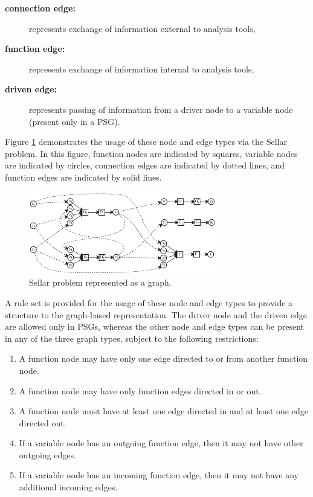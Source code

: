   \begin{description}
  \item[\bf{connection edge:}] represents exchange of information external to analysis tools,
  \item[\bf{function edge:}] represents exchange of information internal to analysis tools,
  \item[\bf{driven edge:}] represents passing of information from a driver node to a 
  variable node (present only in a PSG).
  \end{description}
  Figure \ref{f:sellar types} demonstrates the usage of these node and edge 
  types via the Sellar problem. 
In this figure, function nodes are indicated by squares, 
  variable nodes are indicated by circles, connection edges are indicated by 
  dotted lines, and function edges are indicated by solid lines.
  \begin{figure}[htb!]
    \begin{center}
      \includegraphics[width=3.25in]{images/sellar_types}
    \end{center}
    \caption{Sellar problem represented as a graph.}
  \label{f:sellar types}
  \end{figure} 

  A rule set is provided for the usage of these node and edge types to provide a structure 
  to the graph-based representation. The driver node and the driven edge are allowed only in 
  PSGs, whereas the other node and edge types can be present in any of the three graph types, 
  subject to the following restrictions: 
  \begin{enumerate}
  \item A function node may have only one edge directed to or from another function node.
  \item A function node may have only function edges directed in or out.
  \item A function node must have at least one edge directed in and at least one edge 
    directed out.
  \item If a variable node has an outgoing function edge, then it may not have other 
  outgoing edges.
  \item If a variable node has an incoming function edge, then it may not have any 
  additional incoming edges.
  \end{enumerate}

